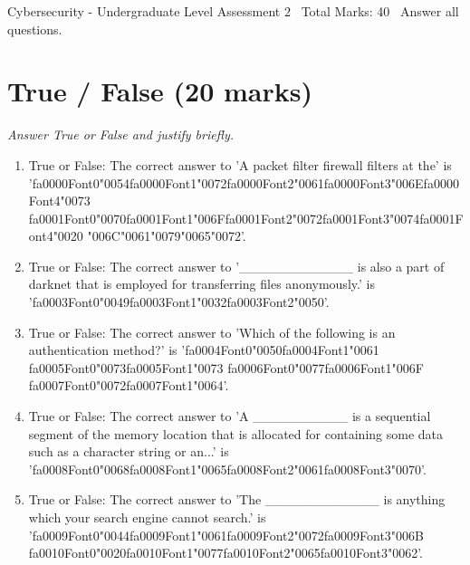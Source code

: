 \documentclass[12pt]{article}
\begin{document}
\begin{center}
Cybersecurity - Undergraduate Level Assessment 2 \
Total Marks: 40 \
Answer all questions.
\end{center}

\section*{True / False (20 marks)}
\textit{Answer True or False and justify briefly.}
\begin{enumerate}[label=\arabic*.]
\item True or False: The correct answer to 'A packet filter firewall filters at the' is '{\csname fa0000Font0\endcsname\char"0054}{\csname fa0000Font1\endcsname\char"0072}{\csname fa0000Font2\endcsname\char"0061}{\csname fa0000Font3\endcsname\char"006E}{\csname fa0000Font4\endcsname\char"0073} {\csname fa0001Font0\endcsname\char"0070}{\csname fa0001Font1\endcsname\char"006F}{\csname fa0001Font2\endcsname\char"0072}{\csname fa0001Font3\endcsname\char"0074}{\csname fa0001Font4\endcsname\char"0020} {\char"006C}{\char"0061}{\char"0079}{\char"0065}{\char"0072}'.
\item True or False: The correct answer to '\_\_\_\_\_\_\_\_\_\_\_\_ is also a part of darknet that is employed for transferring files anonymously.' is '{\csname fa0003Font0\endcsname\char"0049}{\csname fa0003Font1\endcsname\char"0032}{\csname fa0003Font2\endcsname\char"0050}'.
\item True or False: The correct answer to 'Which of the following is an authentication method?' is '{\csname fa0004Font0\endcsname\char"0050}{\csname fa0004Font1\endcsname\char"0061} {\csname fa0005Font0\endcsname\char"0073}{\csname fa0005Font1\endcsname\char"0073} {\csname fa0006Font0\endcsname\char"0077}{\csname fa0006Font1\endcsname\char"006F} {\csname fa0007Font0\endcsname\char"0072}{\csname fa0007Font1\endcsname\char"0064}'.
\item True or False: The correct answer to 'A \_\_\_\_\_\_\_\_\_\_ is a sequential segment of the memory location that is allocated for containing some data such as a character string or an...' is '{\csname fa0008Font0\endcsname\char"0068}{\csname fa0008Font1\endcsname\char"0065}{\csname fa0008Font2\endcsname\char"0061}{\csname fa0008Font3\endcsname\char"0070}'.
\item True or False: The correct answer to 'The \_\_\_\_\_\_\_\_\_\_\_\_ is anything which your search engine cannot search.' is '{\csname fa0009Font0\endcsname\char"0044}{\csname fa0009Font1\endcsname\char"0061}{\csname fa0009Font2\endcsname\char"0072}{\csname fa0009Font3\endcsname\char"006B} {\csname fa0010Font0\endcsname\char"0020}{\csname fa0010Font1\endcsname\char"0077}{\csname fa0010Font2\endcsname\char"0065}{\csname fa0010Font3\endcsname\char"0062}'.

\end{enumerate}
\end{document}
